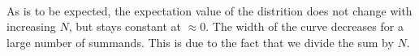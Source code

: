 \begin{figure}[h!]
\begin{minipage}{.3\linewidth}
{      }
    \end{minipage}
    \begin{minipage}{.3\linewidth}
      \centering
    \end{minipage}
\end{figure} \ \\
As is to be expected, the expectation value of the distrition does not change 
with increasing $N$, but stays constant at $\approx0$. The width of the 
curve decreases for a large number of summands. This is due to the fact that 
we divide the sum by $N$.

